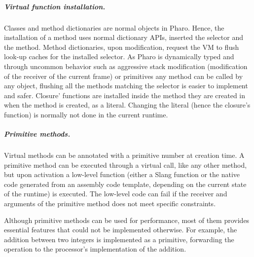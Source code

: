 \documentclass[a4paper,12pt,twoside]{../includes/ThesisStyle}
\begin{document}







\subparagraph{Virtual function installation.}

Classes and method dictionaries are normal objects in Pharo. Hence, the installation of a method uses normal dictionary APIs, inserted the selector and the method. Method dictionaries, upon modification, request the VM to flush look-up caches for the installed selector. As Pharo is dynamically typed and through uncommon behavior such as aggressive stack modification (modification of the receiver of the current frame) or primitives any method can be called by any object, flushing all the methods matching the selector is easier to implement and safer. Closure' functions are installed inside the method they are created in when the method is created, as a literal. Changing the literal (hence the closure's function) is normally not done in the current runtime.

\subparagraph{Primitive methods.}

Virtual methods can be annotated with a primitive number at creation time. A primitive method can be executed through a virtual call, like any other method, but upon activation a low-level function (either a Slang function or the native code generated from an assembly code template, depending on the current state of the runtime) is executed. The low-level code can fail if the receiver and arguments of the primitive method does not meet specific constraints. 

Although primitive methods can be used for performance, most of them provides essential features that could not be implemented otherwise. For example, the addition between two integers is implemented as a primitive, forwarding the operation to the processor's implementation of the addition.
\end{document}
